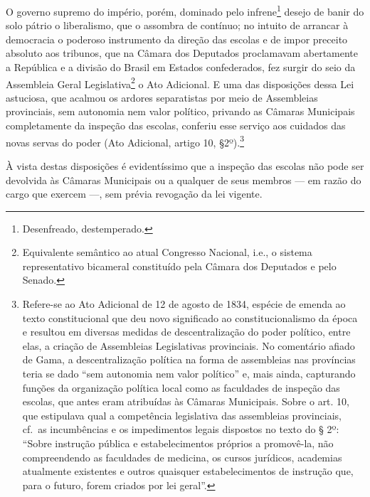 O governo supremo do império, porém, dominado pelo infrene\footnote{
  Desenfreado, destemperado.} desejo de banir do solo pátrio o
liberalismo, que o assombra de contínuo; no intuito de arrancar à
democracia o poderoso instrumento da direção das escolas e de impor
preceito absoluto aos tribunos, que na Câmara dos Deputados proclamavam
abertamente a República e a divisão do Brasil em Estados confederados,
fez surgir do seio da Assembleia Geral Legislativa\footnote{Equivalente semântico ao atual 
Congresso Nacional, i.e., o sistema representativo bicameral constituído pela 
Câmara dos Deputados e pelo Senado.} o Ato Adicional. E uma das disposições 
dessa Lei astuciosa, que acalmou os ardores separatistas por meio de 
Assembleias provinciais, sem autonomia nem valor político, privando as 
Câmaras Municipais completamente da inspeção das escolas, conferiu esse 
serviço aos cuidados das novas servas do poder (Ato Adicional, artigo 10, 
§2º).\footnote{Refere-se ao Ato Adicional de 12 de agosto de 1834, espécie de
  emenda ao texto constitucional que deu novo significado ao
  constitucionalismo da época e resultou em diversas medidas de
  descentralização do poder político, entre elas, a criação de
  Assembleias Legislativas provinciais. No comentário afiado de Gama, a
  descentralização política na forma de assembleias nas províncias teria
  se dado ``sem autonomia nem valor político'' e, mais ainda, capturando
  funções da organização política local como as faculdades de inspeção
  das escolas, que antes eram atribuídas às Câmaras Municipais. Sobre o
  art. 10, que estipulava qual a competência legislativa das assembleias
  provinciais, cf.~as incumbências e os impedimentos legais dispostos no
  texto do § 2º: ``Sobre instrução pública e estabelecimentos próprios a
  promovê-la, não compreendendo as faculdades de medicina, os cursos
  jurídicos, academias atualmente existentes e outros quaisquer
  estabelecimentos de instrução que, para o futuro, forem criados por
  lei geral''.}

À vista destas disposições é evidentíssimo que a inspeção das escolas
não pode ser devolvida às Câmaras Municipais ou a qualquer de seus
membros --- em razão do cargo que exercem ---, sem prévia revogação da lei
vigente.

